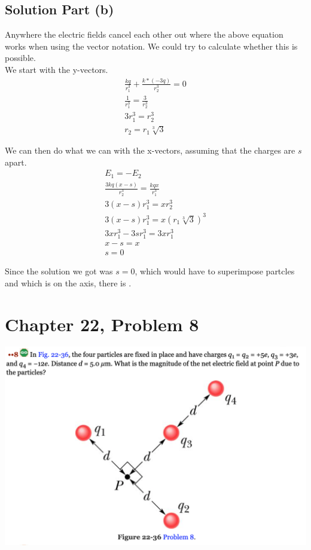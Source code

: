 \documentclass[12pt]{article}
\begin{document}
\subsection*{Solution Part (b)}
Anywhere the electric fields cancel each other out where the above equation works when using the vector notation. We could try to calculate whether this is possible.\\
We start with the y-vectors.
\begin{gather*}
    \frac{kq}{r_1^3} + \frac{k*(-3q)}{r_2^3} = 0\\
    \frac{1}{r_1^3} = \frac{3}{r_2^3}\\
    3r_1^3 = r_2^3\\
    r_2 = r_1 \sqrt[3]{3}
\end{gather*}

We can then do what we can with the x-vectors, assuming that the charges are $s$ apart.
\begin{gather*}
    E_1 = -E_2\\
    \frac{3kq(x - s)}{r_2^3} = \frac{kqx}{r_1^3}\\
    3(x - s)r_1^3 = x r_2^3\\
    3(x - s)r_1^3 = x (r_1 \sqrt[3]{3})^3\\
    3x r_1^3 - 3s r_1^3 = 3x r_1^3\\
    x - s = x\\
    s = 0
\end{gather*}

Since the solution we got was $s = 0$, which would have to superimpose partcles and which is on the axis, there is .

\pagebreak
\section*{Chapter 22, Problem 8}
\includegraphics[width=\textwidth]{picture_5.png}
\end{document}
